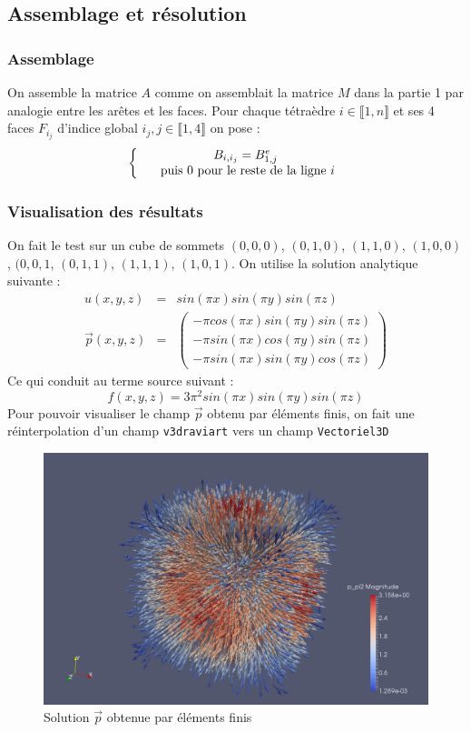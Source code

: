 \documentclass[a4paper,12pt]{article}
\begin{document}
\subsection{Assemblage et résolution}
\subsubsection{Assemblage}
On assemble la matrice $A$ comme on assemblait la matrice $M$ dans la partie 1 par analogie entre les arêtes et les faces. 
Pour chaque tétraèdre $i \in \llbracket 1,n \rrbracket$ et ses 4 faces $F_{i_{j}}$ d'indice global $i_{j},j \in \llbracket 1,4 \rrbracket$ on pose : 
\[
  \left\{
  \begin{array}{r c l}
  & B_{i,i_{j}}=B_{1,j}^{e}\\
  & \text{ puis }0\text{ pour le reste de la ligne $i$}
  \end{array}
  \right.
\]
\subsubsection{Visualisation des résultats}
On fait le test sur un cube de sommets $(0,0,0)$, $(0,1,0)$, $(1,1,0)$, $(1,0,0)$, $(0,0,1$, $(0,1,1)$, $(1,1,1)$, $(1,0,1)$. 
On utilise la solution analytique suivante : 
\begin{eqnarray*}
u(x,y,z) &=& sin(\pi x)sin(\pi y)sin(\pi z) \\
\vec{p}(x,y,z) &=&
\begin{pmatrix}
-\pi cos(\pi x)sin(\pi y)sin(\pi z) \\
-\pi sin(\pi x)cos(\pi y)sin(\pi z) \\
-\pi sin(\pi x)sin(\pi y)cos(\pi z)
\end{pmatrix}
\end{eqnarray*}
Ce qui conduit au terme source suivant :
\[
f(x,y,z) = 3\pi^{2} sin(\pi x)sin(\pi y)sin(\pi z)
\]
Pour pouvoir visualiser le champ $\vec{p}$ obtenu par éléments finis, on fait une réinterpolation d'un champ \texttt{v3draviart} vers un champ \texttt{Vectoriel3D}
\begin{figure}[h!]
\begin{center}
\includegraphics[scale=0.3]{cube_raviart.png}
\caption*{Solution $\vec{p}$ obtenue par éléments finis}
\end{center}
\end{figure}
\end{document}
